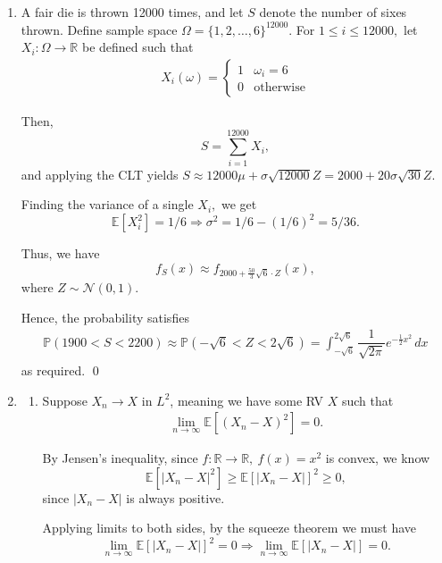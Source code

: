 \documentclass[12pt]{article}
\begin{document}
\begin{enumerate}
  \item A fair die is thrown 12000 times, and let $S$ denote the number of sixes thrown. Define sample space $\Omega = \{1, 2, \ldots, 6\}^{12000}.$ For $1 \leq i \leq 12000,$ let $X_i : \Omega \to \mathbb R$ be defined such that
    \begin{align*}
      X_i(\omega)  =
      \begin{cases}
        1 & \omega_i = 6 \\
        0 & \text{otherwise}
      \end{cases}
    \end{align*}

    Then, $$S = \sum_{i = 1}^{12000} X_i,$$ and applying the CLT yields $S \approx 12000\mu + \sigma \sqrt{12000}Z = 2000 + 20\sigma \sqrt{30} Z.$

    Finding the variance of a single $X_i,$ we get
    $$
    \mathbb E[X_i^2] = 1/6 \Rightarrow \sigma^2 = 1/6 - (1/6)^2 = 5/36.
    $$

    Thus, we have $$
    f_S(x) \approx f_{2000 + \frac{50}{3} \sqrt{6} \cdot Z}(x),
    $$
    where $Z \sim \mathcal N(0, 1).$

    Hence, the probability satisfies
    \begin{align*}
      \mathbb P(1900 < S < 2200) \approx \mathbb P\left(-\sqrt{6} < Z < 2 \sqrt{6}\right) = \int_{-\sqrt{6}}^{2 \sqrt{6}} \dfrac{1}{\sqrt{2\pi}} e^{- \frac{1}{2}x^2} \, dx
    \end{align*}
    as required. \qed

  \item
    \begin{enumerate}
      \item Suppose $X_n \to X$ in $L^2$, meaning we have some RV $X$ such that
        \begin{align*}
          \lim_{n \to \infty} \mathbb E[(X_n - X)^2] = 0.
        \end{align*}

        By Jensen's inequality, since $f: \mathbb R \to \mathbb R, \ f(x) = x^2$ is convex, we know
        $$
        \mathbb E[|X_n - X|^2] \geq \mathbb E[|X_n - X|]^2 \geq 0,
        $$
        since $|X_n - X|$ is always positive.

        Applying limits to both sides, by the squeeze theorem we must have $$
        \lim_{n \to \infty} \mathbb E[|X_n - X|]^2 = 0 \Rightarrow \lim_{n \to \infty} \mathbb E[|X_n - X|] = 0.
        $$


\end{enumerate}
\end{enumerate}
\end{document}
